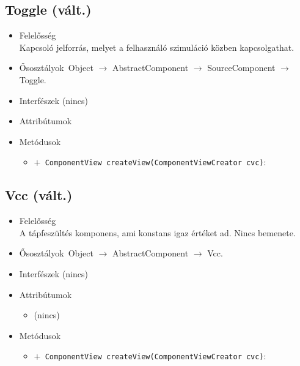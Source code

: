 \subsection{Toggle (vált.)}
\begin{itemize}
\item Felelősség\\
Kapcsoló jelforrás, melyet a felhasználó szimuláció közben kapcsolgathat.
\item Ősosztályok\ Object $\rightarrow{}$ AbstractComponent $\rightarrow{}$ SourceComponent $\rightarrow{}$ Toggle.
\item Interfészek (nincs)
\item Attribútumok $\ $
\item Metódusok$\ $
\begin{itemize}
	\item[] \texttt{$+$ ComponentView createView(ComponentViewCreator cvc)}: 
\end{itemize}
\end{itemize}

\subsection{Vcc (vált.)}
\begin{itemize}
\item Felelősség\\
A tápfeszültés komponens, ami konstans igaz értéket ad. Nincs bemenete.
\item Ősosztályok\ Object $\rightarrow{}$ AbstractComponent $\rightarrow{}$ Vcc.
\item Interfészek (nincs)
\item Attribútumok $\ $
\begin{itemize}
\item (nincs)
\end{itemize}
\item Metódusok$\ $
\begin{itemize}
	\item[] \texttt{$+$ ComponentView createView(ComponentViewCreator cvc)}: 
\end{itemize}
\end{itemize}

